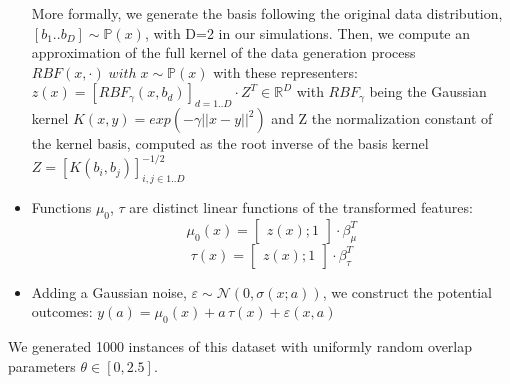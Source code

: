 \documentclass[11pt]{article}
\begin{document}
\begin{itemize}
          More formally, we generate the basis following the original data
          distribution, $\left [ b_1 .. b_D \right ] \sim \mathbb P(x)$,
          with D=2 in our simulations. Then, we compute an approximation
          of the full kernel of the data generation process $RBF(x,
              \cdot) \;  with \; x \sim \mathbb P(x)$ with these
          representers: $z(x) = [RBF_{\gamma}(x, b_d)]_{d=1..D} \cdot
              Z^T \in \mathbb{R}^D$ with $RBF_{\gamma}$ being the Gaussian
          kernel $K(x, y) = exp(-\gamma ||x-y||^2)$ and Z the
          normalization constant of the kernel basis, computed as the
          root inverse of the basis kernel $Z=[K(b_i, b_j)]_{i, j \in
              {1..D}}^{-1/2}$


    \item Functions $\mu_0$, $\tau$ are distinct linear functions of the
          transformed features:
          \begin{equation*}
              \mu_0(x) = \begin{bmatrix} z(x); 1 \end{bmatrix} \cdot \beta_{\mu}^T
          \end{equation*}
          \begin{equation*}
              \tau(x) = \begin{bmatrix} z(x); 1 \end{bmatrix} \cdot \beta_{\tau}^T
          \end{equation*}
    \item Adding a Gaussian noise, $\varepsilon \sim \mathcal N(0, \sigma(x;a))$,
          we construct the potential outcomes:
          $y(a) = \mu_0(x) + a\,\tau(x) + \varepsilon(x, a)$
\end{itemize}
We generated 1000 instances of this dataset with uniformly random overlap
parameters $\theta \in \left[ 0, 2.5 \right]$.
\end{document}
